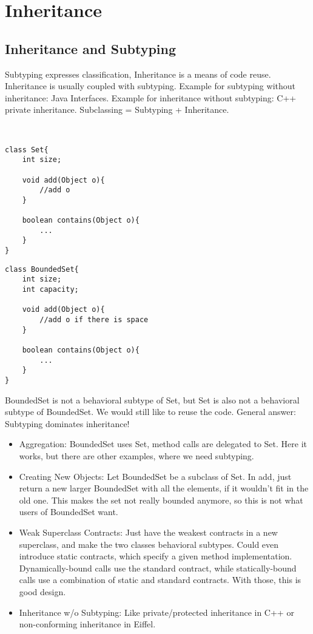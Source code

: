 \section{Inheritance}
\subsection{Inheritance and Subtyping}
\begin{mytitle} Subtyping expresses classification, Inheritance is a means of code reuse. Inheritance is usually coupled with subtyping. Example for subtyping without inheritance: Java Interfaces. Example for inheritance without subtyping: C++ private inheritance. Subclassing = Subtyping + Inheritance.
\end{mytitle}
\begin{mytitle}\hfill\\
\lstset{language=Java}
\begin{minipage}[t]{0.5\textwidth}
\begin{lstlisting}
class Set{
    int size;
    
    void add(Object o){
        //add o 
    }
    
    boolean contains(Object o){
        ...
    }
}
\end{lstlisting}
\end{minipage}
\begin{minipage}[t]{0.5\textwidth}
\begin{lstlisting}
class BoundedSet{
    int size;
    int capacity;
    
    void add(Object o){
        //add o if there is space
    }
    
    boolean contains(Object o){
        ...
    }
}
\end{lstlisting}
\end{minipage}
BoundedSet is not a behavioral subtype of Set, but Set is also not a behavioral subtype of BoundedSet. We would still like to reuse the code. General answer: Subtyping dominates inheritance!
\begin{itemize}
    \item Aggregation: BoundedSet uses Set, method calls are delegated to Set. Here it works, but there are other examples, where we need subtyping.
    \item Creating New Objects: Let BoundedSet be a subclass of Set. In add, just return a new larger BoundedSet with all the elements, if it wouldn't fit in the old one. This makes the set not really bounded anymore, so this is not what users of BoundedSet want.
    \item Weak Superclass Contracts: Just have the weakest contracts in a new superclass, and make the two classes behavioral subtypes. Could even introduce static contracts, which specify a given method implementation. Dynamically-bound calls use the standard contract, while statically-bound calls use a combination of static and standard contracts. With those, this is good design.
    \item Inheritance w/o Subtyping: Like private/protected inheritance in C++ or non-conforming inheritance in Eiffel.
\end{itemize}
\end{mytitle}

